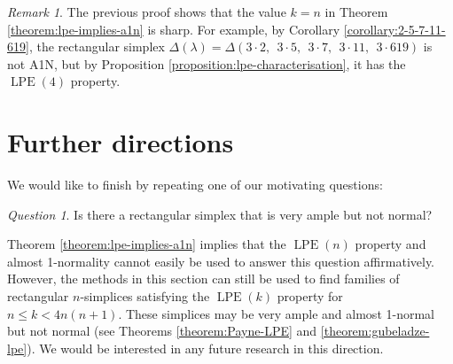 \documentclass[a4paper,11pt]{amsart}
\theoremstyle{plain}
\theoremstyle{definition}
\theoremstyle{remark}
\newtheorem{question}[theorem]{Question}
\newtheorem{remark}[theorem]{Remark}
\DeclareMathOperator{\LPE}{LPE}
\begin{document}
\begin{remark}
    The previous proof shows that the value $k = n$ in Theorem \ref{theorem:lpe-implies-a1n} is sharp. For example, by Corollary \ref{corollary:2-5-7-11-619}, the rectangular simplex $\Delta(\lambda) = \Delta(3 \cdot 2,~~3 \cdot 5,~~3 \cdot 7,~~3 \cdot 11,~~3 \cdot 619)$ is not A1N, but by Proposition \ref{proposition:lpe-characterisation}, it has the $\LPE(4)$ property.
\end{remark}

\section*{Further directions}
We would like to finish by repeating one of our motivating questions:

\begin{question}
    Is there a rectangular simplex that is very ample but not normal?
\end{question}

Theorem \ref{theorem:lpe-implies-a1n} implies that the $\LPE(n)$ property and almost 1-normality cannot easily be used to answer this question affirmatively. However, the methods in this section can still be used to find families of rectangular $n$-simplices satisfying the $\LPE(k)$ property for $n \leq k < 4n(n + 1)$. These simplices may be very ample and almost 1-normal but not normal (see Theorems \ref{theorem:Payne-LPE} and \ref{theorem:gubeladze-lpe}). We would be interested in any future research in this direction.



\end{document}
